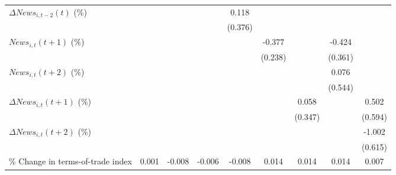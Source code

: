{\begin{tabular}{l*{8}{c}}
\addlinespace
$ \Delta News_{i,t-2}(t)$ (\%)&                     &                     &                     &       0.118         &                     &                     &                     &                     \\
                    &                     &                     &                     &     (0.376)         &                     &                     &                     &                     \\
\addlinespace
$ News_{i,t}(t+1)$ (\%)&                     &                     &                     &                     &      -0.377         &                     &      -0.424         &                     \\
                    &                     &                     &                     &                     &     (0.238)         &                     &     (0.361)         &                     \\
\addlinespace
$ News_{i,t}(t+2)$ (\%)&                     &                     &                     &                     &                     &                     &       0.076         &                     \\
                    &                     &                     &                     &                     &                     &                     &     (0.544)         &                     \\
\addlinespace
$ \Delta News_{i,t}(t+1)$ (\%)&                     &                     &                     &                     &                     &       0.058         &                     &       0.502         \\
                    &                     &                     &                     &                     &                     &     (0.347)         &                     &     (0.594)         \\
\addlinespace
$ \Delta News_{i,t}(t+2)$ (\%)&                     &                     &                     &                     &                     &                     &                     &      -1.002         \\
                    &                     &                     &                     &                     &                     &                     &                     &     (0.615)         \\
\addlinespace
\% Change in terms-of-trade index&       0.001         &      -0.008         &      -0.006         &      -0.008         &       0.014         &       0.014         &       0.014         &       0.007         \\

\end{tabular}}
